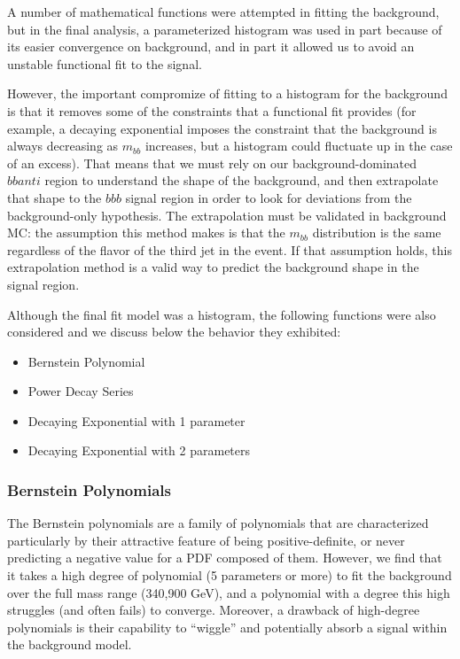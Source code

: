 A number of mathematical functions were attempted in fitting the
background, but in the final analysis, a parameterized histogram was
used in part because of its easier convergence on background, and
in part it allowed us to avoid an unstable functional fit to the signal.

However, the important compromize of fitting to a histogram for the
background is that it removes some of the constraints that a functional
fit provides (for example, a decaying exponential imposes the constraint
that the background is always decreasing as $m_{bb}$ increases, 
but a histogram could fluctuate up in the case of an excess).  That 
means that we must rely on our background-dominated $bbanti$ region
to understand the shape of the background, and then extrapolate that
shape to the $bbb$ signal region in order to look for deviations from
the background-only hypothesis.  The extrapolation must be validated in 
background MC: the assumption this method makes is that the $m_{bb}$
distribution is the same regardless of the flavor of the third jet 
in the event.  If that assumption holds, this extrapolation method is a
valid way to predict the background shape in the signal region.

Although the final fit model was a histogram, the following functions were
also considered and we discuss below the behavior they exhibited:
\begin{itemize}
    \item Bernstein Polynomial
    \item Power Decay Series
    \item Decaying Exponential with 1 parameter
    \item Decaying Exponential with 2 parameters
\end{itemize}

\subsubsection{Bernstein Polynomials}
The Bernstein polynomials are a family of polynomials that are characterized
particularly by their attractive feature of being positive-definite, or never
predicting a negative value for a PDF composed of them.  However, we find
that it takes a high degree of polynomial (5 parameters or more) to fit the
background over the full mass range (340,900 GeV), and a polynomial with a 
degree this high struggles (and often fails) to converge.  Moreover, a
drawback of high-degree polynomials is their capability to ``wiggle'' and
potentially absorb a signal within the background model.

